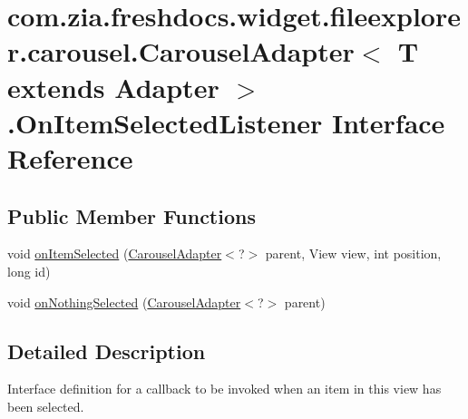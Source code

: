 \hypertarget{interfacecom_1_1zia_1_1freshdocs_1_1widget_1_1fileexplorer_1_1carousel_1_1_carousel_adapter_3_0138b057ca54626d11bff1bb2116384ee5}{\section{com.\-zia.\-freshdocs.\-widget.\-fileexplorer.\-carousel.\-Carousel\-Adapter$<$ T extends Adapter $>$.On\-Item\-Selected\-Listener Interface Reference}
\label{interfacecom_1_1zia_1_1freshdocs_1_1widget_1_1fileexplorer_1_1carousel_1_1_carousel_adapter_3_0138b057ca54626d11bff1bb2116384ee5}
}
\subsection*{Public Member Functions}
\begin{DoxyCompactItemize}
\item 
void \hyperlink{interfacecom_1_1zia_1_1freshdocs_1_1widget_1_1fileexplorer_1_1carousel_1_1_carousel_adapter_3_0138b057ca54626d11bff1bb2116384ee5_ad63da57e05e4733c283e828e05c7e1fe}{on\-Item\-Selected} (\hyperlink{classcom_1_1zia_1_1freshdocs_1_1widget_1_1fileexplorer_1_1carousel_1_1_carousel_adapter_3_01_t_01extends_01_adapter_01_4_a83aef3f3a9694fbc32954c4872b85911}{Carousel\-Adapter}$<$?$>$ parent, View view, int position, long id)
\item 
void \hyperlink{interfacecom_1_1zia_1_1freshdocs_1_1widget_1_1fileexplorer_1_1carousel_1_1_carousel_adapter_3_0138b057ca54626d11bff1bb2116384ee5_a3e86bc794f67b8caf493994293e4e8d5}{on\-Nothing\-Selected} (\hyperlink{classcom_1_1zia_1_1freshdocs_1_1widget_1_1fileexplorer_1_1carousel_1_1_carousel_adapter_3_01_t_01extends_01_adapter_01_4_a83aef3f3a9694fbc32954c4872b85911}{Carousel\-Adapter}$<$?$>$ parent)
\end{DoxyCompactItemize}


\subsection{Detailed Description}
Interface definition for a callback to be invoked when an item in this view has been selected. 

